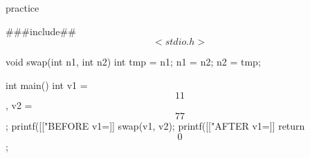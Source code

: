 \documentclass[10pt,t]{beamer}
\begin{document}
  \begin{frame}[fragile]{practice}
    \begin{codeblock}
    ###include## $$<stdio.h>$$

    void swap(int n1, int n2) {
      int tmp = n1;
      n1 = n2;
      n2 = tmp;
    }

    int main() {
      int v1 = $$11$$, v2 = $$77$$;
      printf([["BEFORE  v1=]]%
      swap(v1, v2);
      printf([["AFTER  v1=]]%
      return $$0$$;
    }
    \end{codeblock}

  \end{frame}
\end{document}
